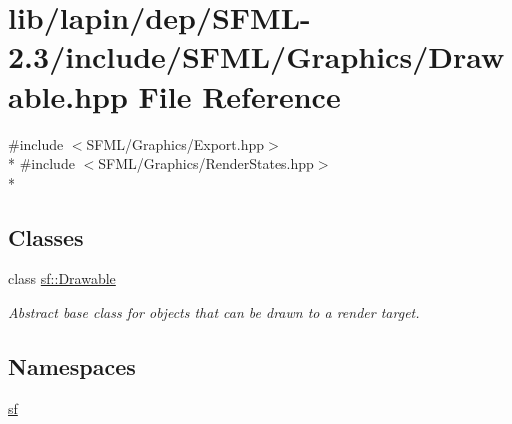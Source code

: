 \hypertarget{lapin_2dep_2_s_f_m_l-2_83_2include_2_s_f_m_l_2_graphics_2_drawable_8hpp}{\section{lib/lapin/dep/\-S\-F\-M\-L-\/2.3/include/\-S\-F\-M\-L/\-Graphics/\-Drawable.hpp File Reference}
\label{lapin_2dep_2_s_f_m_l-2_83_2include_2_s_f_m_l_2_graphics_2_drawable_8hpp}
}
{\ttfamily \#include $<$S\-F\-M\-L/\-Graphics/\-Export.\-hpp$>$}\\*
{\ttfamily \#include $<$S\-F\-M\-L/\-Graphics/\-Render\-States.\-hpp$>$}\\*
\subsection*{Classes}
\begin{DoxyCompactItemize}
\item 
class \hyperlink{classsf_1_1_drawable}{sf\-::\-Drawable}
\begin{DoxyCompactList}\small\item\em Abstract base class for objects that can be drawn to a render target. \end{DoxyCompactList}\end{DoxyCompactItemize}
\subsection*{Namespaces}
\begin{DoxyCompactItemize}
\item 
\hyperlink{namespacesf}{sf}
\end{DoxyCompactItemize}
